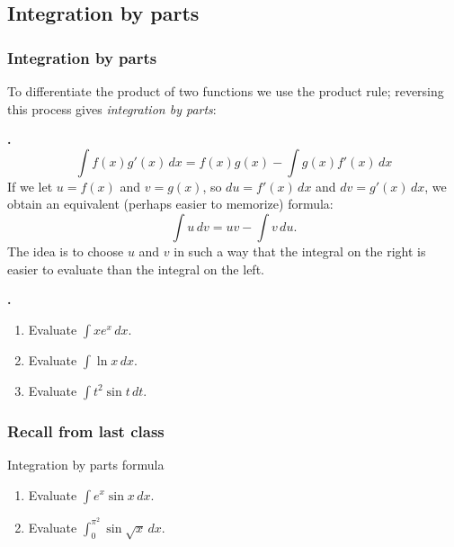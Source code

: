 \documentclass[t]{beamer}
\theoremstyle{plain}
\theoremstyle{definition}
\newcounter{heading}
\newcommand{\newhead}[1]{\medskip\stepcounter{heading}\noindent\textbf{\hspace{0.2cm}{#1}.}}
\begin{document}
\subsection{Integration by parts}

\begin{frame}
\frametitle{Integration by parts}
\noindent To differentiate the product of two functions we use the product rule; reversing this process gives
\textit{integration by parts}:\pause

\vfill

\newhead{Integration by parts formula}
\[\int f(x)g'(x)\,dx = f(x)g(x) - \int g(x)f'(x)\,dx \]\pause
If we let $u = f(x)$ and $v = g(x)$, so $du=f'(x)\,dx$ and $dv = g'(x)\,dx$, we obtain an equivalent (perhaps easier to memorize) formula:
\[\int u\, dv = uv - \int v \, du.\]
The idea is to choose $u$ and $v$ in such a way that the integral on the right is easier to evaluate than the integral on the left.
\end{frame}

\begin{frame}
\newhead{Examples} 

\begin{enumerate}[<+->]
\item Evaluate $ \int x e^{x} \, dx.$

\medskip

\item Evaluate $ \int \ln x \, dx.$

\medskip

\item Evaluate $\int t^{2}\sin t\, dt.$ 

\medskip


\end{enumerate}

\end{frame}

\begin{frame}
\label{tues}
\frametitle{Recall from last class}
\begin{block}{Integration by parts formula}
\uncover<+->{\[\int f(x)g'(x)\,dx = f(x)g(x) - \int g(x)f'(x)\,dx \]}
\end{block}
\begin{enumerate}[<+->]
\item Evaluate $\int e^{x}\sin x \, dx.$



\item Evaluate $\int_{0}^{\pi^{2}} \sin \sqrt{x} \, dx.$
\end{enumerate}

\end{frame}
\end{document}
